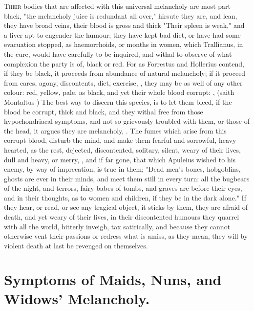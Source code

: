 {\lettrine{T}{heir} bodies that are affected with this universal melancholy are
most part black, "the melancholy juice is redundant all
over," hirsute they are, and lean, they have broad veins, their blood is gross
and thick "Their spleen is weak," and a liver apt to
engender the humour; they have kept bad diet, or have had some evacuation
stopped, as haemorrhoids, or months in women, which
Trallianus, in the cure, would have carefully to be
inquired, and withal to observe of what complexion the party is of, black or
red. For as Forrestus and Hollerius contend, if they be
black, it proceeds from abundance of natural melancholy; if it proceed from
cares, agony, discontents, diet, exercise, \etc{}, they may be as well of any
other colour: red, yellow, pale, as black, and yet their whole blood corrupt:
, (saith
Montaltus ) The best way to
discern this species, is to let them bleed, if the blood be corrupt, thick and
black, and they withal free from those hypochondriacal symptoms, and not so
grievously troubled with them, or those of the head, it argues they are
melancholy, . The fumes which arise from this corrupt blood,
disturb the mind, and make them fearful and sorrowful, heavy hearted, as the
rest, dejected, discontented, solitary, silent, weary of their lives, dull and
heavy, or merry, \etc{}, and if far gone, that which Apuleius wished to his
enemy, by way of imprecation, is true in them; "Dead men's
bones, hobgoblins, ghosts are ever in their minds, and meet them still in every
turn: all the bugbears of the night, and terrors, fairy-babes of tombs, and
graves are before their eyes, and in their thoughts, as to women and children,
if they be in the dark alone." If they hear, or read, or see any tragical
object, it sticks by them, they are afraid of death, and yet weary of their
lives, in their discontented humours they quarrel with all the world, bitterly
inveigh, tax satirically, and because they cannot otherwise vent their passions
or redress what is amiss, as they mean, they will by violent death at last be
revenged on themselves.

\section{Symptoms of Maids, Nuns, and Widows' Melancholy.}

}
